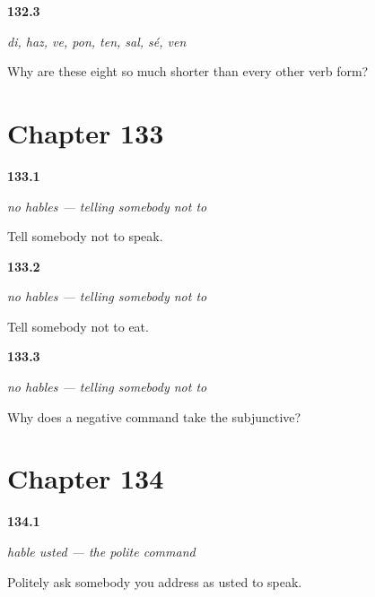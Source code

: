 \noindent\begin{minipage}[t]{\linewidth}
\raggedright
\hypertarget{review-ES-C50-ocho-cortos-why}{\textbf{132.3}} \emph{di, haz, ve, pon, ten, sal, sé, ven}\par
\small Why are these eight so much shorter than every other verb form?
\end{minipage}\par\medskip

\section*{Chapter 133}

\noindent\begin{minipage}[t]{\linewidth}
\raggedright
\hypertarget{review-ES-C50-no-hables-say}{\textbf{133.1}} \emph{no hables — telling somebody not to}\par
\small Tell somebody not to speak.
\end{minipage}\par\medskip

\noindent\begin{minipage}[t]{\linewidth}
\raggedright
\hypertarget{review-ES-C50-no-hables-eat}{\textbf{133.2}} \emph{no hables — telling somebody not to}\par
\small Tell somebody not to eat.
\end{minipage}\par\medskip

\noindent\begin{minipage}[t]{\linewidth}
\raggedright
\hypertarget{review-ES-C50-no-hables-why}{\textbf{133.3}} \emph{no hables — telling somebody not to}\par
\small Why does a negative command take the subjunctive?
\end{minipage}\par\medskip

\section*{Chapter 134}

\noindent\begin{minipage}[t]{\linewidth}
\raggedright
\hypertarget{review-ES-C50-hable-usted-say}{\textbf{134.1}} \emph{hable usted — the polite command}\par
\small Politely ask somebody you address as usted to speak.
\end{minipage}\par\medskip

